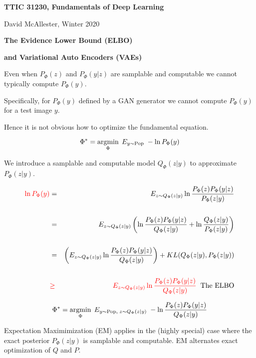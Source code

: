 





{\Huge

  \centerline{\bf TTIC 31230, Fundamentals of Deep Learning}
  \bigskip
  \centerline{David McAllester, Winter 2020}
  \vfill
  \vfil
  \centerline{\bf The Evidence Lower Bound (ELBO)}
  \vfill
  \centerline{\bf and Variational Auto Encoders (VAEs)}
  \vfill
  \vfill


Even when $P_\Phi(z)$ and $P_\Phi(y|z)$ are samplable and computable we cannot typically compute $P_\Phi(y)$.

\vfill
Specifically, for $P_\Phi(y)$ defined by a GAN generator we cannot compute $P_\Phi(y)$ for a test image $y$.

\vfill
Hence it is not obvious how to optimize the fundamental equation.

$$\Phi^* = \operatorname*{argmin}_\Phi\;E_{y \sim \mathrm{Pop}}\;- \ln P_\Phi(y)$$


We introduce a samplable and computable model $Q_\Phi(z|y)$ to approximate $P_\Phi(z|y)$.

{\huge
\begin{eqnarray*}
 {\color{red} \ln P_\Phi(y)} & = & E_{z \sim Q_\Phi(z|y)} \ln \frac{P_\Phi(z)P_\Phi(y|z)}{P_\Phi(z|y)} \\
        \\
 & = & E_{z \sim Q_\Phi(z|y)} \left(\ln \frac{P_\Phi(z)P_\Phi(y|z)}{Q_\Phi(z|y)} + \ln \frac{Q_\Phi(z|y)}{P_\Phi(z|y)}\right) \\
 \\
  & = & \left(E_{z \sim Q_\Phi(z|y)} \ln \frac{P_\Phi(z)P_\Phi(y|z)}{Q_\Phi(z|y)}\right) + KL(Q_\Phi(z|y),P_\Phi(z|y)) \\
  \\
  & {\color{red} \geq} & {\color{red} E_{z \sim Q_\Phi(z|y)} \ln \frac{P_\Phi(z)P_\Phi(y|z)}{Q_\Phi(z|y)}}\;\;\mbox{The ELBO}
\end{eqnarray*}
}



$$\Phi^* = \operatorname*{argmin}_\Phi\; E_{y \sim \mathrm{Pop},\;z \sim Q_\Phi(z|y)}\;-\ln \frac{P_\Phi(z)P_\Phi(y|z)}{Q_\Phi(z|y)}$$


Expectation Maximimization (EM) applies in the (highly special) case where the exact posterior $P_\Phi(z|y)$ is samplable and computable.
EM alternates exact optimization of $Q$ and $P$.

}
